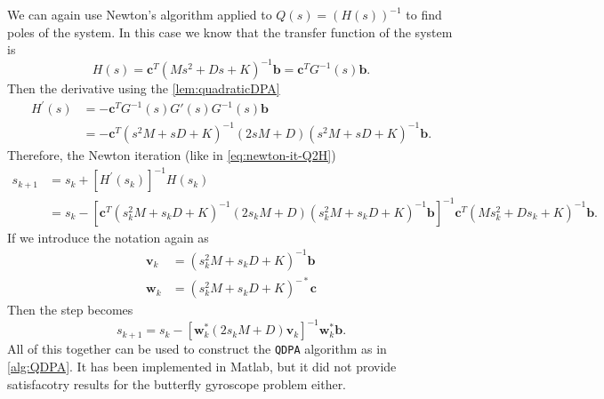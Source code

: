 \documentclass{article}
\begin{document}
	We can again use Newton's algorithm applied to $Q(s) = \left(H(s)\right)^{-1}$ to find poles of the system. In this case we know that the transfer function of the system is 
	\begin{equation}
		H(s) = \textbf{c}^T \left(M s^2 + D s + K\right)^{-1} \textbf{b} = \textbf{c}^T G^{-1}(s) \textbf{b}.
	\end{equation} 
	Then the derivative using the \autoref{lem:quadraticDPA}
	\begin{equation}
		\begin{aligned}
			H^\prime(s) &= -\textbf{c}^T G^{-1}(s)G'(s)G^{-1}(s) \textbf{b} \\ & = -\textbf{c}^T (s^2M+sD+K)^{-1}(2sM+D)(s^2M+sD+K)^{-1} \textbf{b}.
		\end{aligned}
	\end{equation}
	Therefore, the Newton iteration (like in \autoref{eq:newton-it-Q2H})
	\begin{equation}
		\begin{aligned}
			s_{k+1} &= s_{k} + \left[H^\prime(s_k)\right]^{-1} H(s_k) \\ &=  s_{k} - \left[\textbf{c}^T (s_k^2M+s_kD+K)^{-1}(2s_kM+D)(s_k^2M+s_kD+K)^{-1} \textbf{b}\right]^{-1} \textbf{c}^T \left(M s_k^2 + D s_k + K\right)^{-1} \textbf{b}.
		\end{aligned}
	\end{equation}
	If we introduce the notation again as 
	\begin{align}
		\textbf{v}_k &= (s_k^2M+s_kD+K)^{-1} \textbf{b}\\
		\textbf{w}_k &= (s_k^2M+s_kD+K)^{-\ast} \textbf{c}
	\end{align}
	Then the step becomes 
	\begin{equation}
			s_{k+1}  =  s_{k} - \left[\textbf{w}_k^\ast (2s_kM+D)\textbf{v}_k\right]^{-1} \textbf{w}_k^\ast  \textbf{b}.
	\end{equation}
	All of this together can be used to construct the \texttt{QDPA} algorithm as in \autoref{alg:QDPA}. It has been implemented in Matlab, but it did not provide satisfacotry results for the butterfly gyroscope problem either.
\end{document}
